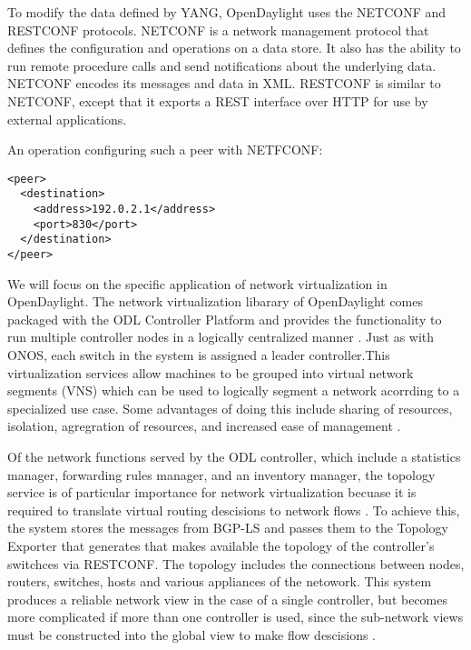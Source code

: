 \documentclass[letterpaper,twocolumn,10pt]{article}
\begin{document}
To modify the data defined by YANG, OpenDaylight uses the NETCONF and RESTCONF protocols. NETCONF is a network management protocol that defines the configuration and operations on a data store. It also has the ability to run remote procedure calls and send notifications about the underlying data. NETCONF encodes its messages and data in XML. RESTCONF is similar to NETCONF, except that it exports a REST interface over HTTP for use by external applications.\cite{enns2011netconf}

An operation configuring such a peer with NETFCONF:\cite{yang}
\begin{lstlisting}
<peer>
  <destination>
    <address>192.0.2.1</address>
    <port>830</port>
  </destination>
</peer>
\end{lstlisting}


We will focus on the specific application of network virtualization in OpenDaylight. The network virtualization libarary of OpenDaylight comes packaged with the ODL Controller Platform and provides the functionality to run multiple controller nodes in a logically centralized manner \cite{ONV:wiki}. Just as with ONOS, each switch in the system is assigned a leader controller.This virtualization services allow machines to be grouped into virtual network segments (VNS) which can be used to logically segment a network acorrding to a specialized use case. Some advantages of doing this include sharing of resources, isolation, agregration of resources, and increased ease of management \cite{jain2013network}.

Of the network functions served by the ODL controller, which include a statistics manager, forwarding rules manager, and an inventory manager, the topology service is of particular importance for network virtualization becuase it is required to translate virtual routing descisions to network flows \cite{jain2013network}. To achieve this, the system stores the messages from BGP-LS and passes them to the Topology Exporter that generates that makes available the topology of the controller's switchces via RESTCONF. The topology includes the connections between nodes, routers, switches, hosts and various appliances of the netowork. This system produces a reliable network view in the case of a single controller, but becomes more complicated if more than one controller is used, since the sub-network views must be constructed into the global view to make flow descisions \cite{bgp:rfc}.

% 
% 
% 
% 
\end{document}
